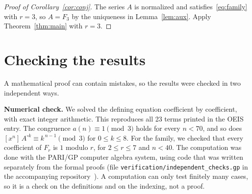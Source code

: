 \documentclass[11pt,a4paper]{article}
\theoremstyle{definition}
\theoremstyle{remark}
\newcommand{\coeff}[2]{[x^{#1}]\,#2}
\newcommand{\para}[1]{\par\medskip\noindent\textbf{#1}\enspace}
\begin{document}
\begin{proof}[Proof of Corollary~\ref{cor:conj}]
The series $A$ is normalized and satisfies~\eqref{eq:family} with $r=3$, so $A=F_3$ by the uniqueness in
Lemma~\ref{lem:aux}. Apply Theorem~\ref{thm:main} with $r=3$.
\end{proof}

\section{Checking the results}\label{sec:checks}

A mathematical proof can contain mistakes, so the results were checked in two independent ways.

\para{Numerical check.}
We solved the defining equation coefficient by coefficient, with exact integer arithmetic. This reproduces all 23
terms printed in the OEIS entry. The congruence $a(n)\equiv1\pmod3$ holds for every $n<70$, and so does
$\coeff{n}{A^{\circ k}}\equiv k^{\,n-1}\pmod3$ for $0\le k\le8$. For the family, we checked that every coefficient of
$F_r$ is $1$ modulo $r$, for $2\le r\le7$ and $n<40$.
The computation was done with the PARI/GP computer algebra system, using code that was written separately from the
formal proofs (file \texttt{verification/independent\_checks.gp} in the accompanying repository~\cite{repo}).
A computation can only test finitely many cases, so it is a check on the definitions and on the indexing, not a proof.
\end{document}
